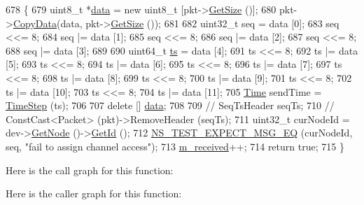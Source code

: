\begin{DoxyCode}
678 \{
679   uint8\_t *\hyperlink{topology-example-sim_8cc_a26c65296e316af77b787dc77469bb2a4}{data} = \textcolor{keyword}{new} uint8\_t [pkt->\hyperlink{classns3_1_1Packet_a462855c9929954d4301a4edfe55f4f1c}{GetSize} ()];
680   pkt->\hyperlink{classns3_1_1Packet_a5a6d304b9e0d90733919ffe224b98f0d}{CopyData}(data, pkt->\hyperlink{classns3_1_1Packet_a462855c9929954d4301a4edfe55f4f1c}{GetSize} ());
681 
682   uint32\_t seq = data [0];
683   seq <<= 8;
684   seq |= data [1];
685   seq <<= 8;
686   seq |= data [2];
687   seq <<= 8;
688   seq |= data [3];
689 
690   uint64\_t \hyperlink{lte_2model_2fading-traces_2fading__trace__generator_8m_ada841f58d7be618bfbc76c87e7d44086}{ts} = data [4];
691   ts <<= 8;
692   ts |= data [5];
693   ts <<= 8;
694   ts |= data [6];
695   ts <<= 8;
696   ts |= data [7];
697   ts <<= 8;
698   ts |= data [8];
699   ts <<= 8;
700   ts |= data [9];
701   ts <<= 8;
702   ts |= data [10];
703   ts <<= 8;
704   ts |= data [11];
705   \hyperlink{classns3_1_1Time}{Time} sendTime = \hyperlink{group__time_ga464a3c1cbb458c6c3ed3bd5ce9506758}{TimeStep} (ts);
706 
707   \textcolor{keyword}{delete} [] \hyperlink{topology-example-sim_8cc_a26c65296e316af77b787dc77469bb2a4}{data};
708 
709 \textcolor{comment}{//  SeqTsHeader seqTs;}
710 \textcolor{comment}{//  ConstCast<Packet> (pkt)->RemoveHeader (seqTs);}
711   uint32\_t curNodeId =  dev->\hyperlink{classns3_1_1NetDevice_a098b6cc4339ac00c62e75cfa48c8aeac}{GetNode} ()->\hyperlink{classns3_1_1Node_aaf49b64a843565ce3812326313b370ac}{GetId} ();
712   \hyperlink{group__testing_ga7304ba46a28d8cf08dfdfd6499cf7068}{NS\_TEST\_EXPECT\_MSG\_EQ} (curNodeId, seq, \textcolor{stringliteral}{"fail to assign channel access"});
713   \hyperlink{classChannelAccessTestCase_a5926e14afc012dd8c71ab238435a3ec9}{m\_received}++;
714   \textcolor{keywordflow}{return} \textcolor{keyword}{true};
715 \}
\end{DoxyCode}


Here is the call graph for this function\+:




Here is the caller graph for this function\+:


